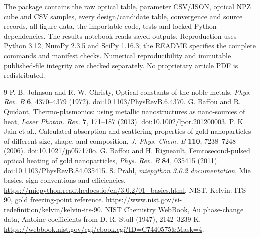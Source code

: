\documentclass[10pt,a4paper]{article}
\begin{document}
The package contains the raw optical table, parameter CSV/JSON, optical NPZ cube and CSV samples, every design/candidate table, convergence and source records, all figure data, the importable code, tests and locked Python dependencies. The results notebook reads saved outputs. Reproduction uses Python 3.12, NumPy 2.3.5 and SciPy 1.16.3; the README specifies the complete commands and manifest checks. Numerical reproducibility and immutable published-file integrity are checked separately. No proprietary article PDF is redistributed.

\newpage
\begin{thebibliography}{9}\small
{} P. B. Johnson and R. W. Christy, Optical constants of the noble metals, \emph{Phys. Rev. B} \textbf{6}, 4370--4379 (1972). \href{https://doi.org/10.1103/PhysRevB.6.4370}{doi:10.1103/PhysRevB.6.4370}.
 G. Baffou and R. Quidant, Thermo-plasmonics: using metallic nanostructures as nano-sources of heat, \emph{Laser Photon. Rev.} \textbf{7}, 171--187 (2013). \href{https://doi.org/10.1002/lpor.201200003}{doi:10.1002/lpor.201200003}.
 P. K. Jain et al., Calculated absorption and scattering properties of gold nanoparticles of different size, shape, and composition, \emph{J. Phys. Chem. B} \textbf{110}, 7238--7248 (2006). \href{https://doi.org/10.1021/jp057170o}{doi:10.1021/jp057170o}.
 G. Baffou and H. Rigneault, Femtosecond-pulsed optical heating of gold nanoparticles, \emph{Phys. Rev. B} \textbf{84}, 035415 (2011). \href{https://doi.org/10.1103/PhysRevB.84.035415}{doi:10.1103/PhysRevB.84.035415}.
 S. Prahl, \emph{miepython 3.0.2 documentation}, Mie basics, sign conventions and efficiencies. \url{https://miepython.readthedocs.io/en/3.0.2/01_basics.html}.
 NIST, Kelvin: ITS-90, gold freezing-point reference. \url{https://www.nist.gov/si-redefinition/kelvin/kelvin-its-90}.
 NIST Chemistry WebBook, Au phase-change data, Antoine coefficients from D. R. Stull (1947), 2142--3239 K. \url{https://webbook.nist.gov/cgi/cbook.cgi?ID=C7440575\&Mask=4}.
\end{thebibliography}
\end{document}
